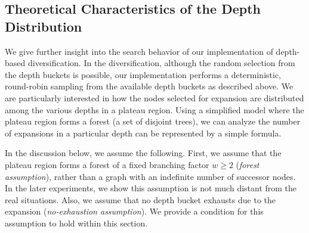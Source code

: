 \subsection{Theoretical Characteristics of the Depth Distribution}
\label{sec:theoretical-characteristics}

We give further insight into the search behavior of our implementation of depth-based diversification.
In the diversification, although the random selection from the depth buckets is possible,
our implementation performs a deterministic, round-robin sampling from the available depth buckets as described above.
% 
We are particularly interested in how the nodes selected for expansion are distributed 
among the various depths in a plateau region.
Using a simplified model where the plateau region forms a forest (a set of disjoint trees),
we can analyze the number of expansions in a particular depth
can be represented by a simple formula. 




% 
In the discussion below, we assume the following.
First, we assume that the plateau region forms a forest of a fixed branching factor
$w\geq 2$ (\emph{forest assumption}), rather than a graph with an indefinite number of successor nodes.
In the later experiments, we show this assumption is not much distant from the real situations.
Also, we assume that no depth bucket exhausts due to the expansion (\emph{no-exhaustion assumption}).
We provide a condition for this assumption to hold within this section.

